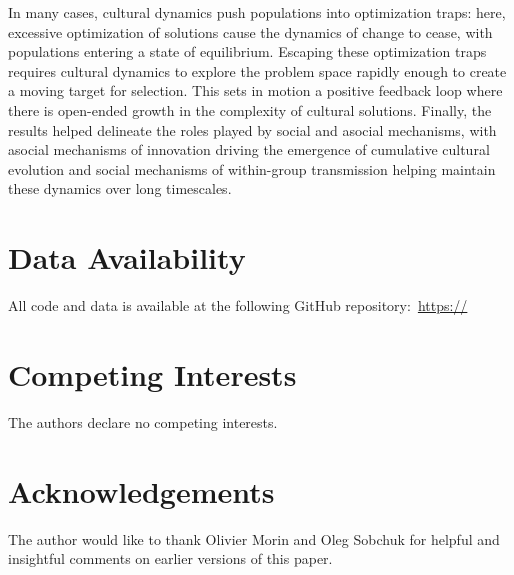\documentclass{article}
\begin{document}
In many cases, cultural dynamics push populations into optimization traps: here, excessive optimization of solutions cause the dynamics of change to cease, with populations entering a state of equilibrium. Escaping these optimization traps requires cultural dynamics to explore the problem space rapidly enough to create a moving target for selection. This sets in motion a positive feedback loop where there is open-ended growth in the complexity of cultural solutions. Finally, the results helped delineate the roles played by social and asocial mechanisms, with asocial mechanisms of innovation driving the emergence of cumulative cultural evolution and social mechanisms of within-group transmission helping maintain these dynamics over long timescales.

\section*{Data Availability}
All code and data is available at the following GitHub repository:~\href{https://}{https://}

\section*{Competing Interests}
The authors declare no competing interests.

\section*{Acknowledgements}
The author would like to thank Olivier Morin and Oleg Sobchuk for helpful and insightful comments on earlier versions of this paper.



\end{document}
